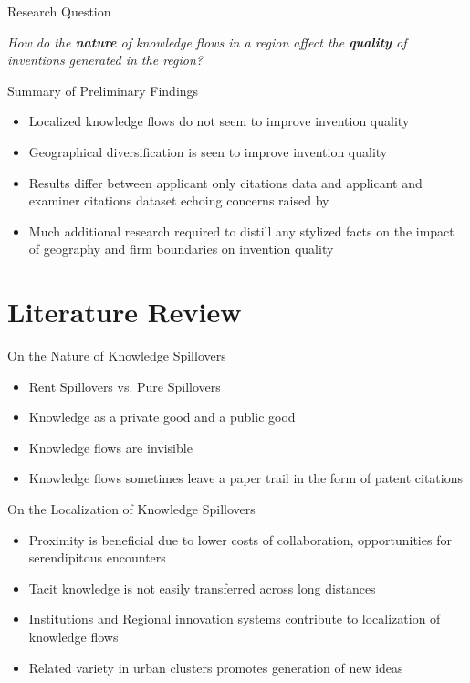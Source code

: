 \documentclass{beamer}
\begin{document}
\begin{frame}{Research Question}{}

\textit{How do the \textbf{nature} of knowledge flows in a region affect the \textbf{quality} of inventions generated in the region?}

\end{frame}

\begin{frame}{Summary of Preliminary Findings}{}
\begin{itemize}
\item{Localized knowledge flows do not seem to improve invention quality}
\item{Geographical diversification is seen to improve invention quality}
\item{Results differ between applicant only citations data and applicant and examiner citations dataset echoing concerns raised by \cite{Alcacer2006a}}
\item{Much additional research required to distill any stylized facts on the impact of geography and firm boundaries on invention quality}
\end{itemize}
\end{frame}

\section{Literature Review}
\begin{frame}{On the Nature of Knowledge Spillovers}{}
\begin{itemize}
\item{Rent Spillovers vs. Pure Spillovers \citep{Griliches1979}}
\item{Knowledge as a private good and a public good \citep{Arrow1962}}
\item{Knowledge flows are invisible \citep{Krugman1991a}}
\item{Knowledge flows sometimes leave a paper trail in the form of patent citations \citep{Jaffe1993}}
\end{itemize}
\end{frame}

\begin{frame}{On the Localization of Knowledge Spillovers}{}
\begin{itemize}
\item{Proximity is beneficial due to lower costs of collaboration, opportunities for serendipitous encounters}
\item{Tacit knowledge is not easily transferred across long distances}
\item{Institutions and Regional innovation systems contribute to localization of knowledge flows}
\item{Related variety \citep*{Boschma2009, Frenken2007, Jacobs1969} in urban clusters promotes generation of new ideas}
\end{itemize}
\end{frame}
\end{document}
